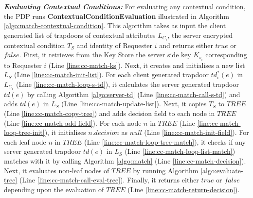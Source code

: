 \documentclass[final,5p,times,twocolumn]{elsarticle}
\begin{document}
\emph{\textbf{Evaluating Contextual Conditions:}}
For evaluating any contextual condition, the PDP runs \textbf{ContextualConditionEvaluation} illustrated in Algorithm \ref{algo:match-contextual-condition}. This algorithm takes as input the client generated list of trapdoors of contextual attributes $L_{C_i}$, the server encrypted contextual condition $T_{S}$ and identity of Requester $i$ and returns either $\mathit{true}$ or $\mathit{false}$. First, it retrieves from the Key Store the server side key $K_{s_i}$ corresponding to Requester $i$ (Line \ref{line:cc-match-ks}). Next, it creates and initialises a new list $L_{S}$ (Line \ref{line:cc-match-init-list}). For each client generated trapdoor $td^*_i (e)$ in $L_{C_i}$ (Line \ref{line:cc-match-loop-s-td}), it calculates the server generated trapdoor $td(e)$ by calling Algorithm \ref{algo:server-td} (Line \ref{line:cc-match-call-s-td}) and adds $td(e)$ in $L_{S}$ (Line \ref{line:cc-match-update-list}). Next, it copies $T_{S}$ to $\mathit{TREE}$ (Line \ref{line:cc-match-copy-tree}) and adds decision field to each node in $\mathit{TREE}$ (Line \ref{line:cc-match-add-field}). For each node $n$ in $\mathit{TREE}$ (Line \ref{line:cc-match-loop-tree-init}), it initialises $n.decision$ as $null$ (Line \ref{line:cc-match-init-field}). For each leaf node $n$ in $\mathit{TREE}$ (Line \ref{line:cc-match-loop-tree-match}), it checks if any server generated trapdoor $td(e)$ in $L_{S}$ (Line \ref{line:cc-match-loop-list-match}) matches with it by calling Algorithm \ref{algo:match} (Line \ref{line:cc-match-decision}). Next, it evaluates non-leaf nodes of $\mathit{TREE}$ by running Algorithm \ref{algo:evaluate-tree} (Line \ref{line:cc-match-call-eval-tree}). Finally, it returns either $\mathit{true}$ or $\mathit{false}$ depending upon the evaluation of $\mathit{TREE}$ (Line \ref{line:cc-match-return-decision}). 
\end{document}
